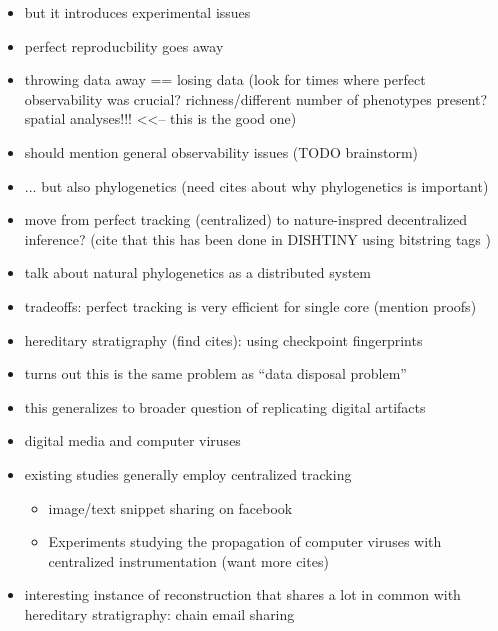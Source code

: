 \begin{itemize}
  \item but it introduces experimental issues
  \item perfect reproducbility goes away
  \item throwing data away == losing data (look for times where perfect observability was crucial? richness/different number of phenotypes present? spatial analyses!!! <<-- this is the good one)
  \item should mention general observability issues (TODO brainstorm)
  \item ... but also phylogenetics (need cites about why phylogenetics is important)
  \item move from perfect tracking (centralized) to nature-inspred decentralized inference? (cite that this has been done in DISHTINY using bitstring tags \citep{moreno2021case})
  \item talk about natural phylogenetics as a distributed system
  \item tradeoffs: perfect tracking is very efficient for single core (mention proofs)
  \item hereditary stratigraphy (find cites): using checkpoint fingerprints
  \item turns out this is the same problem as ``data disposal problem''
\end{itemize}

\begin{itemize}
  \item this generalizes to broader question of replicating digital artifacts
  \item digital media and computer viruses
  \item existing studies generally employ centralized tracking
  \begin{itemize}
    \item image/text snippet sharing on facebook \citep{friggeri2014rumor}
    \item Experiments studying the propagation of computer viruses with centralized instrumentation \citep{cohen1987computer} (want more cites)
  \end{itemize}
  \item interesting instance of reconstruction that shares a lot in common with hereditary stratigraphy: chain email sharing \citep{libennowell2008tracing}
\end{itemize}

